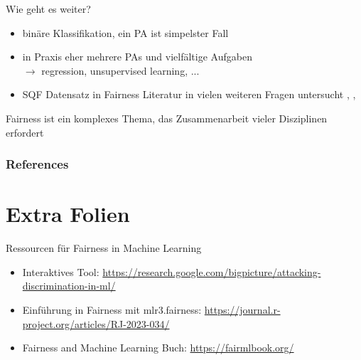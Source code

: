 \documentclass[aspectratio=169]{beamer}
\begin{document}
\begin{frame}{Wie geht es weiter?}
	\begin{itemize}
		\item binäre Klassifikation, ein PA ist simpelster Fall
		\item in Praxis eher mehrere PAs und vielfältige Aufgaben\\ $\rightarrow$ regression, unsupervised learning, ...
		\item SQF Datensatz in Fairness Literatur in vielen weiteren Fragen untersucht \cite{RambachanBBOEFW}, \cite{Kallus2018RUFMLPDa}, \cite{goel2016}
	\end{itemize}
	\vspace*{1cm}
	 Fairness ist ein komplexes Thema, das Zusammenarbeit vieler Disziplinen erfordert
\end{frame}

\begin{frame}[allowframebreaks]
	\frametitle{References}
	
	
\end{frame}

\section{Extra Folien}

\begin{frame}{Ressourcen für Fairness in Machine Learning}
    \begin{itemize}
        \item Interaktives Tool: \url{https://research.google.com/bigpicture/attacking-discrimination-in-ml/}
        \item Einführung in Fairness mit mlr3.fairness: \url{https://journal.r-project.org/articles/RJ-2023-034/}
        \item Fairness and Machine Learning Buch: \url{https://fairmlbook.org/}
    \end{itemize}
\end{frame}
\end{document}

